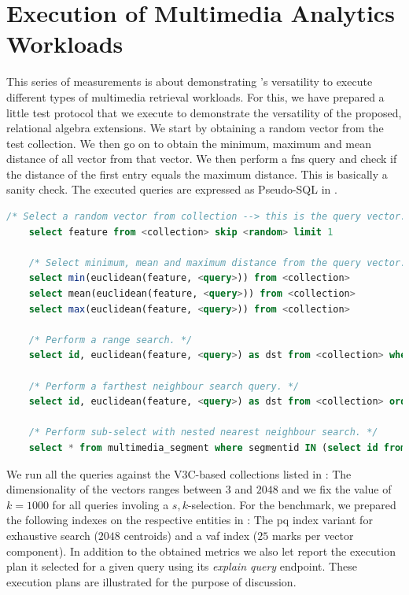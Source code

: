 \section{Execution of Multimedia Analytics Workloads}

This series of measurements is about demonstrating \cottontail{}'s versatility to execute different types of multimedia retrieval workloads. For this, we have prepared a little test protocol that we execute to demonstrate the versatility of the proposed, relational algebra extensions.  We start by obtaining a random vector from the test collection. We then go on to obtain the minimum, maximum and mean distance of all vector from that vector. We then perform a \acrshort{fns} query and check if the distance of the first entry equals the maximum distance. This is basically a sanity check. The executed queries are expressed as Pseudo-SQL in .

\begin{lstlisting}[language=SQL, caption={Pseudo-SQL of the queries executed for the analytics workload evaluation.}, label=listing:analytics_queries, numbers=none]
    /* Select a random vector from collection --> this is the query vector. */
    select feature from <collection> skip <random> limit 1
    
    /* Select minimum, mean and maximum distance from the query vector. */
    select min(euclidean(feature, <query>)) from <collection> 
    select mean(euclidean(feature, <query>)) from <collection> 
    select max(euclidean(feature, <query>)) from <collection> 

    /* Perform a range search. */
    select id, euclidean(feature, <query>) as dst from <collection> where dst = ((<max> - <mean>) / 2) order by dst limit 1000

    /* Perform a farthest neighbour search query. */
    select id, euclidean(feature, <query>) as dst from <collection> order by dst desc limit 1000

    /* Perform sub-select with nested nearest neighbour search. */
    select * from multimedia_segment where segmentid IN (select id from <collection> order by euclidean(feature, <query>) asc limit 1000)
\end{lstlisting}

We run all the queries against the V3C-based collections listed in : The dimensionality of the vectors ranges between $3$ and $2048$ and we fix the value of $k = 1000$ for all queries involing a $s,k$-selection. For the benchmark, we prepared the following indexes on the respective entities in \cottontail{}: The \acrshort{pq} index variant for exhaustive search ($2048$ centroids) and a \acrshort{vaf} index ($25$ marks per vector component). In addition to the obtained metrics we also let \cottontail{} report the execution plan it selected for a given query using its \emph{explain query} endpoint. These execution plans are illustrated for the purpose of discussion.

